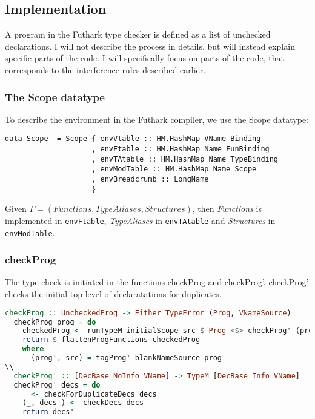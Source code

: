 \subsection{Implementation}
A program in the Futhark type checker is defined as a list of unchecked
declarations.
I will not describe the process in details, but will instead
explain specific parts of the code.
I will specifically focus on parts of the code, that corresponds to the
interference rules described earlier.
\\
\subsubsection{The Scope datatype}
To describe the environment in the Futhark compiler, we use the Scope datatype:
\begin{verbatim}
data Scope  = Scope { envVtable :: HM.HashMap VName Binding
                    , envFtable :: HM.HashMap Name FunBinding
                    , envTAtable :: HM.HashMap Name TypeBinding
                    , envModTable :: HM.HashMap Name Scope
                    , envBreadcrumb :: LongName
                    }
\end{verbatim}
Given $\Gamma = (Functions, TypeAliases, Structures)$, then \textit{Functions} is
implemented in \texttt{envFtable}, \textit{TypeAliases} in \texttt{envTAtable} and \textit{Structures} in \texttt{envModTable}.
\subsubsection{checkProg}
The type check is initiated in the functions checkProg and checkProg'.
checkProg' checks the initial top level of declaratations for duplicates.
\begin{lstlisting}[language=Haskell]
  checkProg :: UncheckedProg -> Either TypeError (Prog, VNameSource)
  checkProg prog = do
    checkedProg <- runTypeM initialScope src $ Prog <$> checkProg' (progDecs prog')
    return $ flattenProgFunctions checkedProg
    where
      (prog', src) = tagProg' blankNameSource prog
\\  
  checkProg' :: [DecBase NoInfo VName] -> TypeM [DecBase Info VName]
  checkProg' decs = do
    _ <- checkForDuplicateDecs decs
    (_, decs') <- checkDecs decs
    return decs'
\end{lstlisting}
